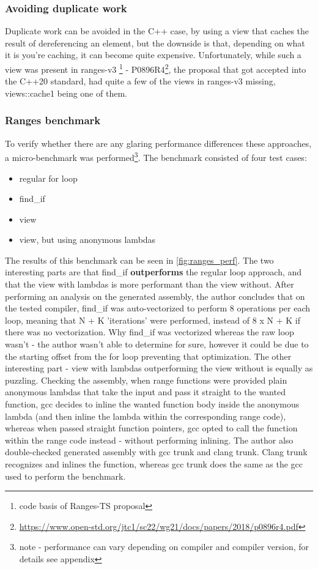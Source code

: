 \documentclass[
    english, %
]{VUMIFPSkursinis}
\begin{document}
\FloatBarrier
\subsubsection{Avoiding duplicate work}

Duplicate work can be avoided in the C++ case, by using a view that caches the result of dereferencing an element, but the downside is that, depending on what it is you're caching, it can become quite expensive. Unfortunately, while such a view was present in ranges-v3 \footnote{code basis of Ranges-TS proposal} - P0896R4\footnote{\url{https://www.open-std.org/jtc1/sc22/wg21/docs/papers/2018/p0896r4.pdf}}, the proposal that got accepted into the C++20 standard, had quite a few of the views in ranges-v3 missing, views::cache1 being one of them.

\FloatBarrier
\subsubsection{Ranges benchmark}

To verify whether there are any glaring performance differences these approaches, a micro-benchmark was performed\footnote{note - performance can vary depending on compiler and compiler version, for details see appendix}. The benchmark consisted of four test cases:
\begin{itemize}
    \item regular for loop
    \item find\_if
    \item view
    \item view, but using anonymous lambdas
\end{itemize}

The results of this benchmark can be seen in \cref{fig:ranges_perf}. The two interesting parts are that find\_if \textbf{outperforms} the regular loop approach, and that the view with lambdas is more performant than the view without. After performing an analysis on the generated assembly, the author concludes that on the tested compiler, find\_if was auto-vectorized to perform 8 operations per each loop, meaning that N + K 'iterations' were performed, instead of 8 x N + K if there was no vectorization. Why find\_if was vectorized whereas the raw loop wasn't - the author wasn't able to determine for sure, however it could be due to the starting offset from the for loop preventing that optimization.
The other interesting part - view with lambdas outperforming the view without is equally as puzzling. Checking the assembly, when range functions were provided plain anonymous lambdas that take the input and pass it straight to the wanted function, gcc decides to inline the wanted function body inside the anonymous lambda (and then inline the lambda within the corresponding range code), whereas when passed straight function pointers, gcc opted to call the function within the range code instead - without performing inlining. The author also double-checked generated assembly with gcc trunk and clang trunk. Clang trunk recognizes and inlines the function, whereas gcc trunk does the same as the gcc used to perform the benchmark.
\end{document}
